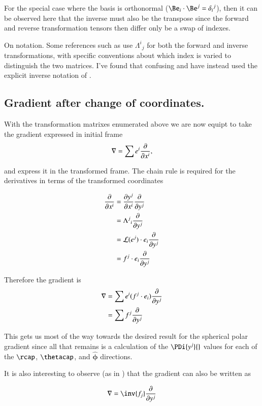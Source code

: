 \documentclass{article}
\newcommand{\phicap}[0]{\hat{\boldsymbol{\phi}}}
\newcommand{\Lor}[2]{{{\Lambda^{#1}}_{#2}}}
\begin{document}
For the special case where the basis is orthonormal ($\Be_i \cdot \Be^j = {\delta_i}^j$), then it can be observed here that the inverse must also be the
transpose since the forward and reverse transformation tensors then differ only be a swap of indexes. 

On notation.  Some references such as \cite{MinahanTensors} use $\Lor{i}{j}$ for both the forward and inverse transformations, with specific conventions
about which index is varied to distinguish the two matrices.  I've found that confusing and have instead used the explicit inverse notation
of \cite{SpenceTensors}.



\subsection{ Gradient after change of coordinates. }

With the transformation matrixes enumerated above we are now equipt to take the gradient expressed in initial frame
\begin{align*}
\nabla = \sum e^i \frac{\partial {}}{\partial {x^i}},
\end{align*}

and express it in the transformed frame.  The chain rule is required for the derivatives in terms of the transformed coordinates

\begin{align*}
\PD{x^i}{} 
&= \PD{x^i}{y^j} \PD{y^j}{} \\
&= \Lor{j}{i} \PD{y^j}{} \\
&= \LL(e^j) \cdot e_i \PD{y^j}{} \\
&= f^j \cdot e_i \PD{y^j}{}
\end{align*}

Therefore the gradient is
\begin{align*}
\nabla &= \sum e^i (f^j \cdot e_i) \frac{\partial {}}{\partial {y^j}} \\
      &= \sum f^j \frac{\partial {}}{\partial {y^j}} \\
\end{align*}

This gets us most of the way towards the desired result for the spherical polar gradient since all that remains is a calculation of the $\PDi{y^j}{}$
values for
each of the $\rcap$, $\thetacap$, and $\phicap$ directions.

It is also interesting to observe (as in \cite{DenkerMaxwell}) that the gradient can also be written as

\begin{align*}
\grad &= \inv{f_j} \PD{y^j}{} \\
\end{align*}
\end{document}
